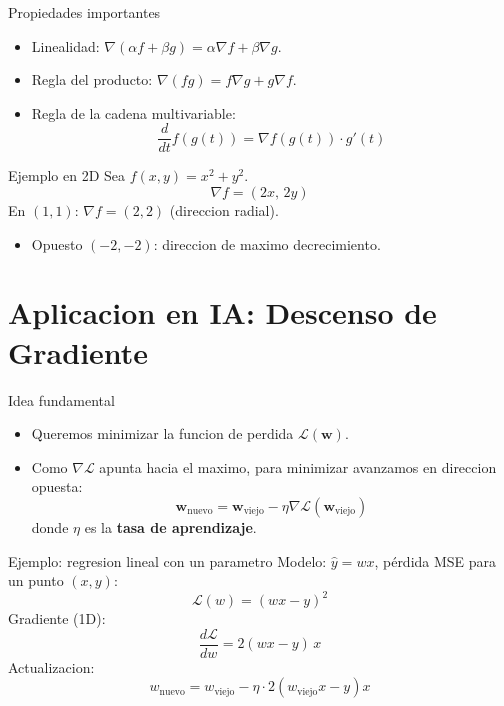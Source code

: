 \documentclass[aspectratio=169, 10pt, xcolor=table]{beamer}
\begin{document}
\begin{frame}{Propiedades importantes}
    \begin{itemize}
        \item Linealidad: $\nabla(\alpha f + \beta g) = \alpha\nabla f + \beta\nabla g$.
        \item Regla del producto: $\nabla(fg) = f\nabla g + g\nabla f$.
        \item Regla de la cadena multivariable: 
        \[
        \frac{d}{dt} f(g(t)) = \nabla f(g(t)) \cdot g'(t)
        \]
    \end{itemize}
\end{frame}

\begin{frame}{Ejemplo en 2D}
    Sea $f(x,y)=x^2+y^2$.
    \[
    \nabla f = (2x,\, 2y)
    \]
    En $(1,1)$: $\nabla f = (2,2)$ (direccion radial).
    \begin{itemize}
        \item Opuesto $(-2,-2)$: direccion de maximo decrecimiento.
    \end{itemize}
\end{frame}

\section{Aplicacion en IA: Descenso de Gradiente}

\begin{frame}{Idea fundamental}
    \begin{itemize}
        \item Queremos minimizar la funcion de perdida $\mathcal{L}(\mathbf{w})$.
        \item Como $\nabla\mathcal{L}$ apunta hacia el maximo, para minimizar avanzamos en direccion opuesta:
        \[
        \mathbf{w}_{\text{nuevo}} = \mathbf{w}_{\text{viejo}} - \eta \nabla\mathcal{L}(\mathbf{w}_{\text{viejo}})
        \]
        donde $\eta$ es la \textbf{tasa de aprendizaje}.
    \end{itemize}
\end{frame}

\begin{frame}{Ejemplo: regresion lineal con un parametro}
    Modelo: $\hat{y}=wx$, pérdida MSE para un punto $(x,y)$:
    \[
    \mathcal{L}(w) = (wx - y)^2
    \]
    Gradiente (1D):
    \[
    \frac{d\mathcal{L}}{dw} = 2(wx - y)\,x
    \]
    Actualizacion:
    \[
    w_{\text{nuevo}} = w_{\text{viejo}} - \eta \cdot 2(w_{\text{viejo}}x - y)x
    \]
\end{frame}
\end{document}

